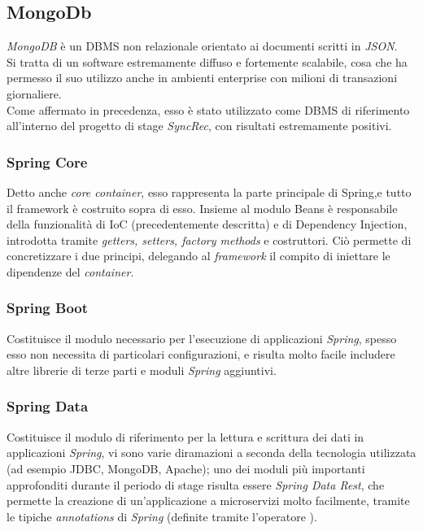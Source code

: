 \subsection{MongoDb}
\textit{MongoDB} è un \gls{DBMS} non relazionale orientato ai documenti scritti in \textit{JSON}.\\
Si tratta di un software estremamente diffuso e fortemente scalabile, cosa che ha permesso il suo utilizzo anche in ambienti enterprise con milioni di transazioni giornaliere.\\
Come affermato in precedenza, esso è stato utilizzato come DBMS di riferimento all'interno del progetto di stage \textit{SyncRec}, con risultati estremamente positivi.


\subsubsection{Spring Core}
Detto anche \textit{core container}, esso rappresenta la parte principale di Spring,e tutto il framework è costruito sopra di esso.
Insieme al modulo Beans è responsabile della funzionalità di IoC (precedentemente descritta) e  di Dependency Injection, introdotta tramite \textit{getters, setters, factory methods} e costruttori.
Ciò permette di concretizzare i due principi, delegando al \textit{framework} il compito di iniettare le dipendenze del \textit{container}.



\subsubsection{Spring Boot}
Costituisce il modulo necessario per l'esecuzione di applicazioni \textit{Spring}, spesso esso non necessita di particolari configurazioni, e risulta molto facile includere altre librerie di terze parti e moduli \textit{Spring} aggiuntivi.\\

\subsubsection{Spring Data}
Costituisce il modulo di riferimento per la lettura e scrittura dei dati in applicazioni \textit{Spring}, vi sono varie diramazioni 	a seconda della tecnologia utilizzata (ad esempio JDBC, MongoDB, Apache); uno dei moduli più importanti approfonditi durante il periodo di stage risulta essere \textit{Spring Data Rest}, che permette la creazione di un'applicazione a microservizi molto facilmente, tramite le tipiche \textit{annotations} di \textit{Spring} (definite tramite l'operatore \@).


